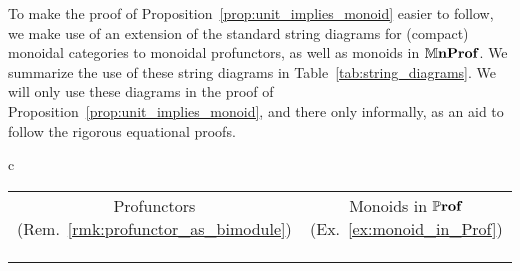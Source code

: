 \documentclass[11pt,oneside,article]{memoir}
\begin{document}
To make the proof of Proposition~\ref{prop:unit_implies_monoid} easier to follow, we make use of an
extension of the standard string diagrams for (compact) monoidal categories to monoidal profunctors,
as well as monoids in $\mathbb{M}\mathbf{nProf}$. We summarize the use of these string diagrams in
Table~\ref{tab:string_diagrams}. We will only use these diagrams in the proof of
Proposition~\ref{prop:unit_implies_monoid}, and there only informally, as an aid to follow the
rigorous equational proofs.

\begin{table}
  \centering
  \setlength{\extrarowheight}{3pt}
  \begin{tabular}{c}
    \toprule
    \begin{tabular}{@{\hspace{6pt}}cccc@{\hspace{6pt}}}
      \multicolumn{2}{c}{Profunctors (Rem.~\ref{rmk:profunctor_as_bimodule})}
      & \multicolumn{2}{c}{Monoids in $\mathbb{P}\mathbf{rof}$ (Ex.~\ref{ex:monoid_in_Prof})} \\
      \cmidrule[\lightrulewidth](r){1-2}\cmidrule[\lightrulewidth](l){3-4}
      \begin{tikzpicture}
        \matrix {
          \node [draw, circle] (f) {f}; \&[.2cm]
          \node [draw]         (m) {m}; \\
        };
        \begin{scope}[on background layer]
          \node[fit={(m)}] (back) {};
        \end{scope}
        \draw[ar] ($(f)-(1cm,0)$) to["c'"] (f);
        \draw[ar] (f) to["c"] (m.west);
        \draw[ar] (m) to["d"] +(1cm,0);
        \node [caption] {$m\cdot f$};
      \end{tikzpicture}
      &
      \begin{tikzpicture}
        \matrix {
          \node [draw]        (m) {m}; \&[.2cm]
          \node [draw,circle] (g) {g}; \\
        };
        \begin{scope}[on background layer]
          \node[fit={(m)}] (back) {};
        \end{scope}
        \draw[ar] ($(m)-(1cm,0)$) to["c"] (m);

\end{tikzpicture}
\end{tabular}
\end{tabular}
\end{table}
\end{document}
